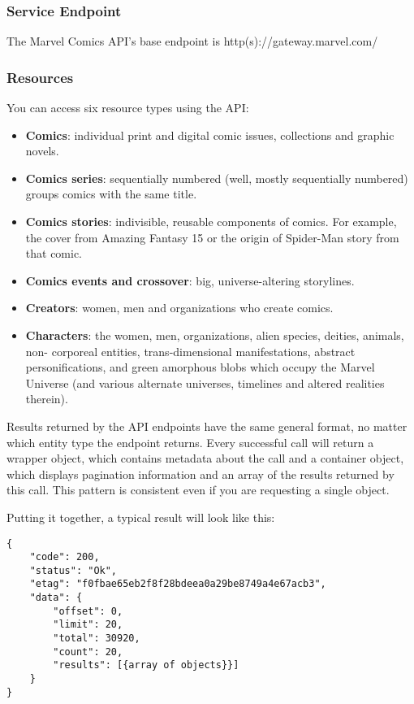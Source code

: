 \subsubsection{Service Endpoint}
The Marvel Comics API’s base endpoint is http(s)://gateway.marvel.com/

\subsubsection{Resources}
You can access six resource types using the API:
\begin{itemize}
\item {\textbf{Comics}}: individual print and digital comic issues, collections and graphic novels.
\item {\textbf{Comics series}}: sequentially numbered (well, mostly sequentially numbered) groups comics with the same title.
\item {\textbf{Comics stories}}: indivisible, reusable components of comics. For example, the cover from Amazing Fantasy 15 or the origin of Spider-Man story from that comic.
\item {\textbf{Comics events and crossover}}: big, universe-altering storylines.
\item {\textbf{Creators}}: women, men and organizations who create comics.
\item {\textbf{Characters}}: the women, men, organizations, alien species, deities, animals, non- corporeal entities, trans-dimensional manifestations, abstract personifications, and green amorphous blobs which occupy the Marvel Universe (and various alternate universes, timelines and altered realities therein).
\end{itemize}

Results returned by the API endpoints have the same general format, no matter which entity type the endpoint returns. Every successful call will return a wrapper object, which contains metadata about the call and a container object, which displays pagination information and an array of the results returned by this call. This pattern is consistent even if you are requesting a single object.


Putting it together, a typical result will look like this:
\begin{lstlisting}
{
	"code": 200,
	"status": "Ok",
	"etag": "f0fbae65eb2f8f28bdeea0a29be8749a4e67acb3",
	"data": {
		"offset": 0,
		"limit": 20,
		"total": 30920,
		"count": 20,
		"results": [{array of objects}}]
	}
}
\end{lstlisting}


